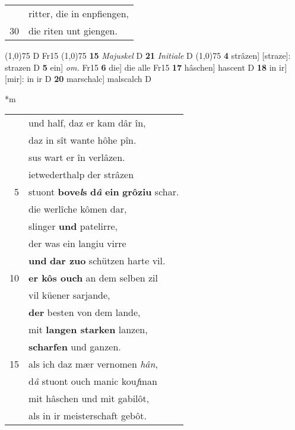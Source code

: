\documentclass[8pt,a4paper,notitlepage]{article}
\begin{document}
\begin{table}[ht]
\begin{minipage}[t]{0.5\linewidth}
\begin{tabular}{rl}
 & ritter, die in enpfiengen,\\ 
30 & die riten unt giengen.\\ 
\end{tabular}
\scriptsize
\line(1,0){75} \newline
D Fr15 \newline
\line(1,0){75} \newline
\textbf{15} \textit{Majuskel} D  \textbf{21} \textit{Initiale} D  \newline
\line(1,0){75} \newline
\textbf{4} strâzen] [straze]: strazen D \textbf{5} ein] \textit{om.} Fr15 \textbf{6} die] die alle Fr15 \textbf{17} hâschen] hascent D \textbf{18} in ir] [mir]: in ir D \textbf{20} marschalc] malscalch D \newline
\end{minipage}
\hspace{0.5cm}
\begin{minipage}[t]{0.5\linewidth}
\small
\begin{center}*m
\end{center}
\begin{tabular}{rl}
 & und half, daz er kam dâr în,\\ 
 & daz in sît wante hôhe pîn.\\ 
 & sus wart er în verlâzen.\\ 
 & ietwederthalp der strâzen\\ 
5 & stuont \textbf{bove\textit{l}s} \textbf{d\textit{â}} \textbf{ein} \textbf{grôziu} schar.\\ 
 & die werlîche kômen dar,\\ 
 & slinger \textbf{und} patelirre,\\ 
 & der was ein langiu virre\\ 
 & \textbf{und} \textbf{dar zuo} schützen harte vil.\\ 
10 & \textbf{er kôs ouch} an dem selben zil\\ 
 & vil küener sarjande,\\ 
 & \textbf{der} besten von dem lande,\\ 
 & mit \textbf{langen starken} lanzen,\\ 
 & \textbf{scharfen} und ganzen.\\ 
15 & als ich daz mær vernomen \textit{hân},\\ 
 & d\textit{â} stuont ouch manic kou\textit{f}man\\ 
 & mit hâschen und mit gabilôt,\\ 
 & als in ir meisterschaft gebôt.\\ 

\end{tabular}
\end{minipage}
\end{table}
\end{document}
